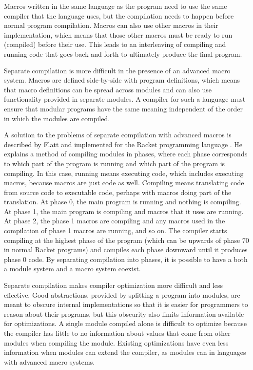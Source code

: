 Macros written in the same language as the program need to use the same compiler that the language uses, but the compilation needs to happen before normal program compilation.
Macros can also use other macros in their implementation, which means that those other macros must be ready to run (compiled) before their use.
This leads to an interleaving of compiling and running code that goes back and forth to ultimately produce the final program.

Separate compilation is more difficult in the presence of an advanced macro system.
Macros are defined side-by-side with program definitions, which means that macro definitions can be spread across modules and can also use functionality provided in separate modules.
A compiler for such a language must ensure that modular programs have the same meaning independent of the order in which the modules are compiled.

A solution to the problems of separate compilation with advanced macros is described by Flatt and implemented for the Racket programming language \cite{Flatt}.
He explains a method of compiling modules in phases, where each phase corresponds to which part of the program is running and which part of the program is compiling.
In this case, running means executing code, which includes executing macros, because macros are just code as well.
Compiling means translating code from source code to executable code, perhaps with macros doing part of the translation.
At phase 0, the main program is running and nothing is compiling.
At phase 1, the main program is compiling and macros that it uses are running.
At phase 2, the phase 1 macros are compiling and any macros used in the compilation of phase 1 macros are running, and so on.
The compiler starts compiling at the highest phase of the program (which can be upwards of phase 70 in normal Racket programs) and compiles each phase downward until it produces phase 0 code. 
By separating compilation into phases, it is possible to have a both a module system and a macro system coexist.

Separate compilation makes compiler optimization more difficult and less effective.
Good abstractions, provided by splitting a program into modules, are meant to obscure internal implementations so that it is easier for programmers to reason about their programs, but this obscurity also limits information available for optimizations. 
A single module compiled alone is difficult to optimize because the compiler has little to no information about values that come from other modules when compiling the module.
Existing optimizations have even less information when modules can extend the compiler, as modules can in languages with advanced macro systems. 

